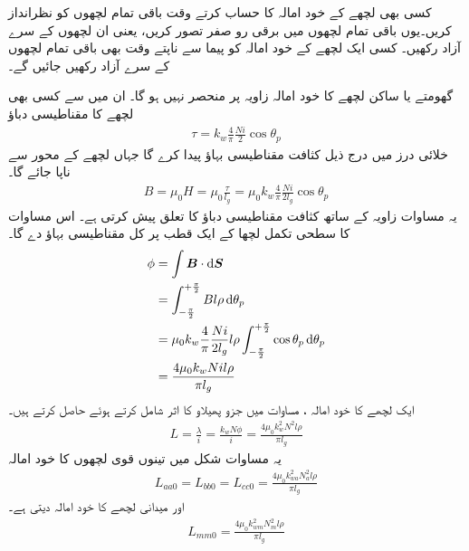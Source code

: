 کسی بھی لچھے کے خود امالہ کا حساب کرتے وقت باقی تمام لچھوں کو نظرانداز کریں۔یوں  باقی تمام لچھوں میں برقی رو صفر تصور کریں، یعنی ان لچھوں  کے سرے آزاد رکھیں۔ کسی ایک لچھے کے خود امالہ کو پیما سے ناپتے وقت بھی باقی تمام لچھوں کے سرے آزاد رکھیں جائیں گے۔ 


گھومتے یا ساکن لچھے کا خود امالہ  زاویہ  پر منحصر نہیں ہو گا۔ ان میں سے کسی بھی لچھے کا مقناطیسی دباؤ  
\begin{align}
\tau=k_w \frac{4}{\pi}\frac{N i}{2} \cos \theta_p
\end{align}
خلائی درز میں درج ذیل  کثافت مقناطیسی بہاؤ   پیدا کرے گا جہاں  لچھے کے محور سے ناپا جائے گا۔	
\begin{align}
B=\mu_0 H=\mu_0 \frac{\tau}{l_g}=\mu_0 k_w \frac{4}{\pi}\frac{N i}{2 l_g} \cos \theta_p
\end{align}
یہ مساوات زاویہ  کے ساتھ  کثافت مقناطیسی دباؤ  کا تعلق پیش کرتی ہے۔ اس مساوات کا سطحی تکمل لچھا کے ایک قطب پر  کل مقناطیسی بہاؤ   دے گا۔
\begin{gather}
\begin{aligned}\label{مساوات_معاصر_بہاو_بذریع_سطحی_تکمل}
\phi&=\int \kvec{B} \cdot \dif \kvec{S}\\
&=\int_{-\frac{\pi}{2}}^{+\frac{\pi}{2}} B l \rho \dif \theta_p\\
&=\mu_0 k_w \frac{4}{\pi}\frac{N i}{2 l_g} l \rho \int_{-\frac{\pi}{2}}^{+\frac{\pi}{2}}  \cos  \theta_p \dif \theta_p\\
&=\frac{4 \mu_0 k_w N i l \rho}{\pi l_g}
\end{aligned}
\end{gather}
ایک  لچھے کا خود امالہ ،  مساوات  میں جزو پھیلاو  کا اثر  شامل کرتے ہوئے  حاصل کرتے ہیں۔
\begin{align}
L=\frac{\lambda}{i}=\frac{k_w N \phi}{i}=\frac{4 \mu_0 k_w^2 N^2  l \rho}{\pi l_g}
\end{align}
یہ مساوات شکل  میں تینوں قوی لچھوں کا خود امالہ
\begin{align}\label{مساوات_معاصر_تین_ساکن_امالہ_برابر}
L_{aa0}=L_{bb0}=L_{cc0}=\frac{4 \mu_0 k_{wa}^2 N_a^2  l \rho}{\pi l_g}
\end{align}
اور  میدانی لچھے کا خود امالہ دیتی ہے۔
\begin{align}
L_{mm0}=\frac{4 \mu_0 k_{wm}^2 N_m^2  l \rho}{\pi l_g}
\end{align}

